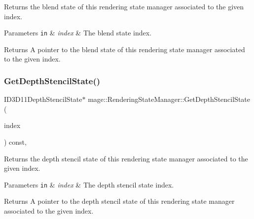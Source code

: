 Returns the blend state of this rendering state manager associated to the given index.


\begin{DoxyParams}[1]{Parameters}
\mbox{\tt in}  & {\em index} & The blend state index. \\
\hline
\end{DoxyParams}
\begin{DoxyReturn}{Returns}
A pointer to the blend state of this rendering state manager associated to the given index. 
\end{DoxyReturn}
\hypertarget{classmage_1_1_rendering_state_manager_aabd3a4bec099f0325c238bdfa43cbc88}{}\label{classmage_1_1_rendering_state_manager_aabd3a4bec099f0325c238bdfa43cbc88} 
\subsubsection{\texorpdfstring{Get\+Depth\+Stencil\+State()}{GetDepthStencilState()}}
{\footnotesize\ttfamily I\+D3\+D11\+Depth\+Stencil\+State$\ast$ mage\+::\+Rendering\+State\+Manager\+::\+Get\+Depth\+Stencil\+State (\begin{DoxyParamCaption}\item[{\hyperlink{classmage_1_1_rendering_state_manager_abcfd0e984d2ba2710320882430d6871a}{Depth\+Stencil\+State\+Index}}]{index }\end{DoxyParamCaption}) const\hspace{0.3cm}{\ttfamily [private]}, {\ttfamily [noexcept]}}

Returns the depth stencil state of this rendering state manager associated to the given index.


\begin{DoxyParams}[1]{Parameters}
\mbox{\tt in}  & {\em index} & The depth stencil state index. \\
\hline
\end{DoxyParams}
\begin{DoxyReturn}{Returns}
A pointer to the depth stencil state of this rendering state manager associated to the given index. 
\end{DoxyReturn}
\hypertarget{classmage_1_1_rendering_state_manager_a193a9a4f29256fd8aab7585eb9f810ed}{}\label{classmage_1_1_rendering_state_manager_a193a9a4f29256fd8aab7585eb9f810ed} 
